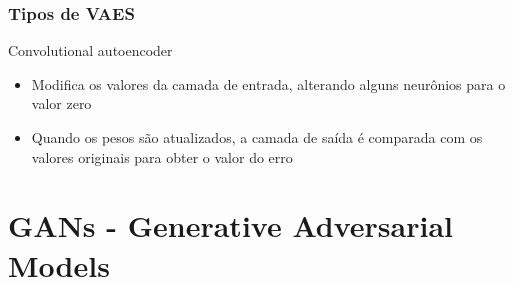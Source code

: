 \documentclass{beamer}
\begin{document}
\begin{frame}
	\frametitle{Tipos de VAES}
	\begin{block}{Convolutional autoencoder}
	\begin{itemize}
		\item Modifica os valores da camada de entrada, alterando alguns
		neurônios para o valor zero
		\item Quando os pesos são atualizados, a camada de saída é comparada
		com os valores originais para obter o valor do erro
	\end{itemize}
	\end{block}
\end{frame}
\section{GANs - Generative Adversarial Models}
\end{document}
